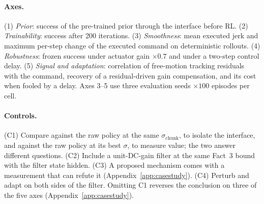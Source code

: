 \documentclass{article}
\newcommand{\schunk}{\sigma_{\mathrm{chunk}}}
\begin{document}
\paragraph{Axes.} (1) \emph{Prior}: success of the pre-trained prior through the interface before RL. (2) \emph{Trainability}: success after 200 iterations. (3) \emph{Smoothness}: mean executed jerk and maximum per-step change of the executed command on deterministic rollouts. (4) \emph{Robustness}: frozen success under actuator gain $\times0.7$ and under a two-step control delay. (5) \emph{Signal and adaptation}: correlation of free-motion tracking residuals with the command, recovery of a residual-driven gain compensation, and its cost when fooled by a delay. Axes 3--5 use three evaluation seeds $\times100$ episodes per cell.

\paragraph{Controls.} (C1) Compare against the raw policy at the same $\schunk$, to isolate the interface, and against the raw policy at its best $\sigma$, to measure value; the two answer different questions. (C2) Include a unit-DC-gain filter at the same Fact~3 bound with the filter state hidden. (C3) A proposed mechanism comes with a measurement that can refute it (Appendix~\ref{app:casestudy}). (C4) Perturb and adapt on both sides of the filter. Omitting C1 reverses the conclusion on three of the five axes (Appendix~\ref{app:casestudy}).
\end{document}

